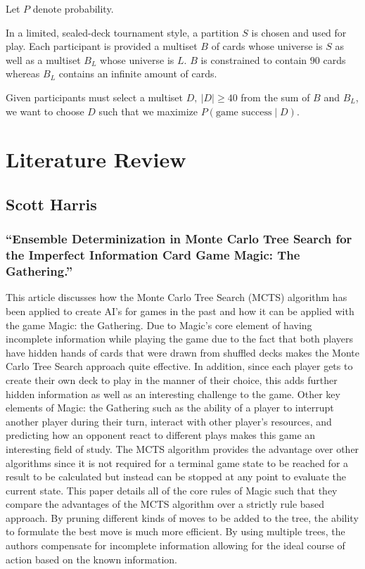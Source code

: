 \documentclass[12pt, letterpaper]{article}
\begin{document}
Let $ P $ denote probability.

In a limited, sealed-deck tournament style, a partition $ S $ is chosen and used for play.
Each participant is provided a multiset $ B $ of cards whose universe is $ S $
as well as a multiset $ B_L $ whose universe is $ L $.
$ B $ is constrained to contain $ 90 $ cards
whereas $ B_L $ contains an infinite amount of cards.

Given participants must select a multiset $ D, \ |D| \ge 40 $ from the sum of $ B $ and $ B_L $,
we want to choose $ D $ such that we maximize $ P(\text{game success} \mid D) $.

\section{Literature Review}

\subsection{Scott Harris}

\subsubsection{\enquote{Ensemble Determinization in Monte Carlo Tree Search for the Imperfect Information Card Game Magic: The Gathering.}}

This article discusses how the Monte Carlo Tree Search (MCTS) algorithm
has been applied to create AI’s for games in the
past and how it can be applied with the game Magic: the Gathering.
Due to Magic's core element of having incomplete information while playing the game
due to the fact that both players have hidden hands of cards that were drawn from
shuffled decks makes the Monte Carlo Tree Search approach quite effective.
In addition,
since each player gets to create their own deck to play in the manner of their choice,
this adds further hidden information as well as an interesting challenge to the game.
Other key elements of Magic: the Gathering such as the ability of a player to
interrupt another player during their turn,
interact with other player’s resources, and predicting how an opponent
react to different plays makes this game an interesting field of study.
The MCTS algorithm provides the advantage over
other algorithms since it is not required for a terminal game state to be reached for a result to be calculated
but instead can be stopped at any point to evaluate the current state.
This paper details all of the core rules of Magic such that they compare the advantages of the
MCTS algorithm over a strictly rule based approach.
By pruning different kinds of moves to be added to the tree,
the ability to formulate the best move is much more efficient.
By using multiple trees,
the authors compensate for incomplete information allowing for the ideal course of action based on the known information.
\end{document}
